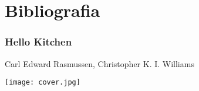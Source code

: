 \documentclass[draft, xetex]{beamer}
\begin{document}
\section[Bibliografia]{Bibliografia}

\begin{frame}
	\frametitle{Hello Kitchen}
	
	
	\begin{thebibliography}{10}

		\beamertemplatebookbibitems
		
			Carl Edward Rasmussen, Christopher K. I. Williams
			
	\begin{center}
		\texttt{[image: cover.jpg]}	
	\end{center}

	\end{thebibliography}
\end{frame}
\end{document}

